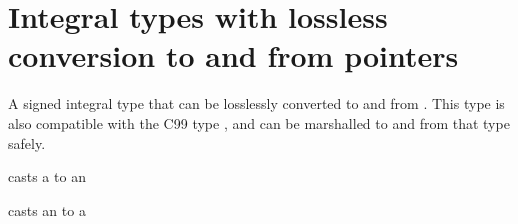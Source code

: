 \section{Integral types with lossless conversion to and from pointers}
\begin{haddockdesc}
\item[\begin{tabular}{@{}l}
data IntPtr
\end{tabular}]
{\haddockbegindoc
A signed integral type that can be losslessly converted to and from
 .  This type is also compatible with the C99 type , and
 can be marshalled to and from that type safely.\par}
\end{haddockdesc}
\begin{haddockdesc}
\item[\begin{tabular}{@{}l}
instance Bits IntPtr\\instance Bounded IntPtr\\instance Enum IntPtr\\instance Storable IntPtr\\instance Ix IntPtr\\instance Num IntPtr\\instance Read IntPtr\\instance Integral IntPtr\\instance Real IntPtr\\instance Show IntPtr\\instance Eq IntPtr\\instance Ord IntPtr
\end{tabular}]
\end{haddockdesc}
\begin{haddockdesc}
\item[\begin{tabular}{@{}l}
ptrToIntPtr :: Ptr a -> IntPtr
\end{tabular}]
{\haddockbegindoc
casts a  to an \par}
\end{haddockdesc}
\begin{haddockdesc}
\item[\begin{tabular}{@{}l}
intPtrToPtr :: IntPtr -> Ptr a
\end{tabular}]
{\haddockbegindoc
casts an  to a \par}
\end{haddockdesc}
